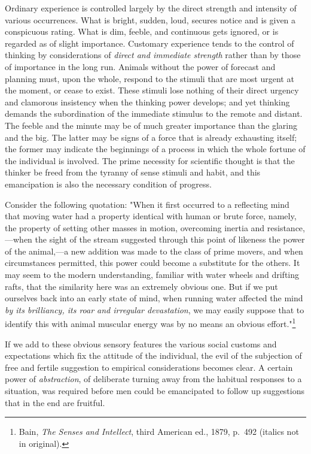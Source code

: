 \documentclass[letterpaper]{book}
\begin{document}
Ordinary experience is controlled largely by the direct strength and
intensity of various occurrences. What is bright, sudden, loud, secures
notice and is given a conspicuous rating. What is dim, feeble, and
continuous gets ignored, or is regarded as of slight importance.
Customary experience tends to the control of thinking by considerations
of \emph{direct and immediate strength} rather than by those of
importance in the long run. Animals without the power of forecast and
planning must, upon the whole, respond to the stimuli that are most
urgent at the moment, or cease to exist. These stimuli lose nothing of
their direct urgency and clamorous insistency when the thinking power
develops; and yet
thinking
demands the subordination of the immediate stimulus to the remote and
distant. The feeble and the minute may be of much greater importance
than the glaring and the big. The latter may be signs of a force that is
already exhausting itself; the former may indicate the beginnings of a
process in which the whole fortune of the individual is involved. The
prime necessity for scientific thought is that the thinker be freed from
the tyranny of sense stimuli and habit, and this emancipation is also
the necessary condition of progress.


Consider the following quotation: "When it first occurred to a
reflecting mind that moving water had a property identical with human or
brute force, namely, the property of setting other masses in motion,
overcoming inertia and resistance,---when the sight of the stream
suggested through this point of likeness the power of the animal,---a
new addition was made to the class of prime movers, and when
circumstances permitted, this power could become a substitute for the
others. It may seem to the modern understanding, familiar with water
wheels and drifting rafts, that the similarity here was an extremely
obvious one. But if we put ourselves back into an early state of mind,
when running water affected the mind \emph{by its brilliancy, its roar
and irregular devastation}, we may easily suppose that to identify this
with animal muscular energy was by no means an obvious
effort."\footnote{
Bain, \emph{The Senses and Intellect}, third American ed., 1879, p.\ 492
(italics not in original).
}


If we add to these obvious sensory features the various social customs
and expectations which fix the attitude of the individual, the evil of
the subjection of free and fertile suggestion to empirical
considerations
becomes
clear. A certain power of \emph{abstraction}, of deliberate turning away
from the habitual responses to a situation, was required before men
could be emancipated to follow up suggestions that in the end are
fruitful.
\end{document}
